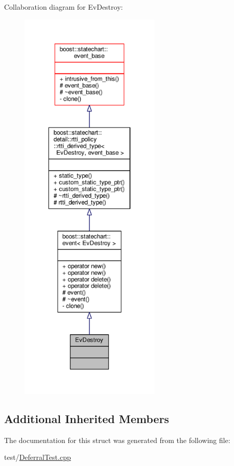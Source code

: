 Collaboration diagram for Ev\+Destroy\+:
\nopagebreak
\begin{figure}[H]
\begin{center}
\leavevmode
\includegraphics[height=550pt]{struct_ev_destroy__coll__graph}
\end{center}
\end{figure}
\subsection*{Additional Inherited Members}


The documentation for this struct was generated from the following file\+:\begin{DoxyCompactItemize}
\item 
test/\mbox{\hyperlink{_deferral_test_8cpp}{Deferral\+Test.\+cpp}}\end{DoxyCompactItemize}
